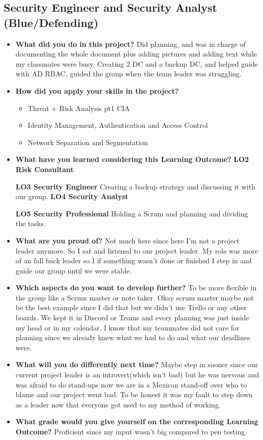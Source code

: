 \documentclass[12pt, letterpaper]{article}
\begin{document}
\subsection{Security Engineer and Security Analyst (Blue/Defending)}
\begin{itemize}
\item \textbf{What did you do in this project?}
\hfill\break
Did planning, and was in charge of documenting the whole document plus adding pictures and adding text while my classmates were busy, Creating 2 DC and a backup DC, and helped guide with AD RBAC, guided the group when the team leader was struggling.
\item \textbf{How did you apply your skills in the project?}
\begin{itemize}
    \item Threat + Risk Analysis pt1 CIA
    \item Identity Management, Authentication and Access Control
    \item Network Separation and Segmentation
    
\end{itemize}
\item \textbf{What have you learned considering this Learning Outcome?}
\break
\textbf{LO2 Risk Consultant}

\textbf{LO3 Security Engineer}
\hfill\break
Creating a backup strategy and discussing it with our group.
\hfill\break
\textbf{LO4 Security Analyst}

\textbf{LO5 Security Professional}
\hfill\break
Holding a Scrum and planning and dividing the tasks.
\hfill\break
\item \textbf{What are you proud of?}
\hfill\break
Not much here since here I'm not a project leader anymore. So I sat and listened to our project leader. My role was more of an fall back leader so I if something wasn't done or finished I step in and guide our group until we were stable.
\hfill\break
\item \textbf{Which aspects do you want to develop further?}
\hfill\break
To be more flexible in the group like a Scrum master or note taker. Okay scrum master maybe not be the best example since I did that but we didn't use Trello or any other boards. We kept it in Discord or Teams and every planning was just inside my head or in my calendar. I know that my teammates did not care for planning since we already knew what we had to do and what our deadlines were.
\hfill\break
\item \textbf{What will you do differently next time?}
Maybe step in sooner since our current project leader is an introvert(which isn't bad) but he was nervous and was afraid to do stand-ups now we are in a Mexican stand-off over who to blame and our project went bad. To be honest it was my fault to step down as a leader now that everyone got used to my method of working.
\item \textbf{What grade would you give yourself on the corresponding Learning Outcome?}
\hfill\break
Proficient since my input wasn't big compared to pen testing.
\end{itemize}
\end{document}
